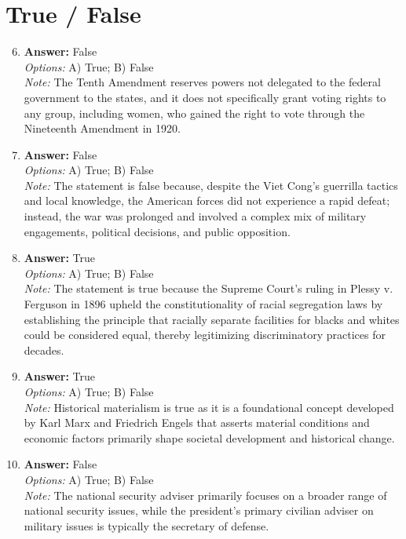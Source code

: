 \documentclass[12pt]{article}
\begin{document}
\section*{True / False}
\begin{enumerate}[label=\arabic*.]
\setcounter{enumi}{5}
\item \textbf{Answer:} False
\\ \textit{Options:} A) True; B) False
\\ \textit{Note:} The Tenth Amendment reserves powers not delegated to the federal government to the states, and it does not specifically grant voting rights to any group, including women, who gained the right to vote through the Nineteenth Amendment in 1920.
\item \textbf{Answer:} False
\\ \textit{Options:} A) True; B) False
\\ \textit{Note:} The statement is false because, despite the Viet Cong's guerrilla tactics and local knowledge, the American forces did not experience a rapid defeat; instead, the war was prolonged and involved a complex mix of military engagements, political decisions, and public opposition.
\item \textbf{Answer:} True
\\ \textit{Options:} A) True; B) False
\\ \textit{Note:} The statement is true because the Supreme Court's ruling in Plessy v. Ferguson in 1896 upheld the constitutionality of racial segregation laws by establishing the principle that racially separate facilities for blacks and whites could be considered equal, thereby legitimizing discriminatory practices for decades.
\item \textbf{Answer:} True
\\ \textit{Options:} A) True; B) False
\\ \textit{Note:} Historical materialism is true as it is a foundational concept developed by Karl Marx and Friedrich Engels that asserts material conditions and economic factors primarily shape societal development and historical change.
\item \textbf{Answer:} False
\\ \textit{Options:} A) True; B) False
\\ \textit{Note:} The national security adviser primarily focuses on a broader range of national security issues, while the president's primary civilian adviser on military issues is typically the secretary of defense.
\end{enumerate}
\end{document}
